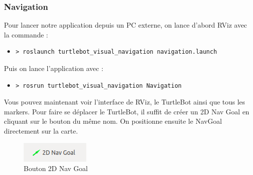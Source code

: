 \documentclass[10pt,a4paper]{article}
\begin{document}
\subsubsection{Navigation}

Pour lancer notre application depuis un PC externe, on lance d'abord RViz avec la commande :
\begin{itemize}
\item[]  \begin{verbatim}> roslaunch turtlebot_visual_navigation navigation.launch \end{verbatim}
\end{itemize}

Puis on lance l'application avec :
\begin{itemize}
\item[]  \begin{verbatim}> rosrun turtlebot_visual_navigation Navigation \end{verbatim}
\end{itemize}

Vous pouvez maintenant voir l'interface de RViz, le TurtleBot ainsi que tous les markers.
Pour faire se déplacer le TurtleBot, il suffit de créer un 2D Nav Goal en cliquant sur le bouton du même nom. On positionne ensuite le NavGoal directement sur la carte.\\
\begin{figure}[!h]
  \centering
  \noindent\includegraphics[scale=0.5]{2DNavGoal.png} 
  \caption{Bouton 2D Nav Goal}
\end{figure}
\end{document}
